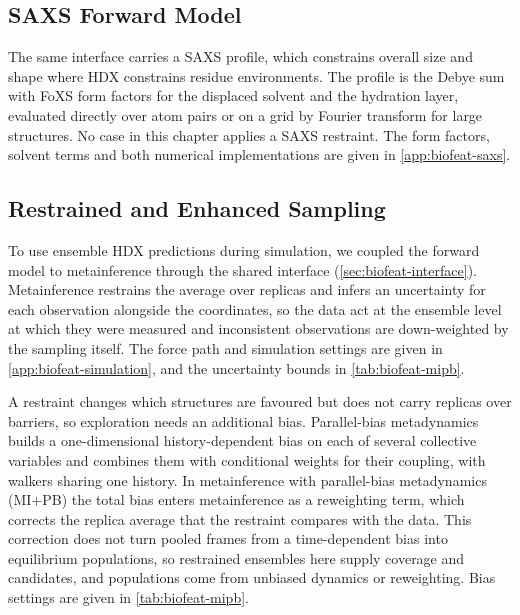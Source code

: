 \subsection{SAXS Forward Model}
\label{sec:biofeat-saxs}

The same interface carries a SAXS profile, which constrains overall size and shape where HDX constrains residue environments. The profile is the Debye sum with FoXS form factors for the displaced solvent and the hydration layer,\supercite{debyeZerstreuungRontgenstrahlen1915,schneidman-duhovnyFoXSWebServer2010} evaluated directly over atom pairs or on a grid by Fourier transform for large structures.\supercite{chamberlainFittingHighresolutionElectron2023} No case in this chapter applies a SAXS restraint. The form factors, solvent terms and both numerical implementations are given in \cref{app:biofeat-saxs}.

\subsection{Restrained and Enhanced Sampling}
\label{sec:biofeat-metainference}
\label{sec:biofeat-metadynamics}

To use ensemble HDX predictions during simulation, we coupled the forward model to metainference through the shared interface (\cref{sec:biofeat-interface}). Metainference restrains the average over replicas and infers an uncertainty for each observation alongside the coordinates,\supercite{bonomiMetadynamicMetainferenceEnhanced2016} so the data act at the ensemble level at which they were measured and inconsistent observations are down-weighted by the sampling itself. The force path and simulation settings are given in \cref{app:biofeat-simulation}, and the uncertainty bounds in \cref{tab:biofeat-mipb}.

A restraint changes which structures are favoured but does not carry replicas over barriers, so exploration needs an additional bias. Parallel-bias metadynamics builds a one-dimensional history-dependent bias on each of several collective variables and combines them with conditional weights for their coupling, with walkers sharing one history.\supercite{pfaendtnerEfficientSamplingHighDimensional2015} In metainference with parallel-bias metadynamics (MI+PB) the total bias enters metainference as a reweighting term,\supercite{alamdariEfficientSamplingHighDimensional2021} which corrects the replica average that the restraint compares with the data. This correction does not turn pooled frames from a time-dependent bias into equilibrium populations, so restrained ensembles here supply coverage and candidates, and populations come from unbiased dynamics or reweighting. Bias settings are given in \cref{tab:biofeat-mipb}.

